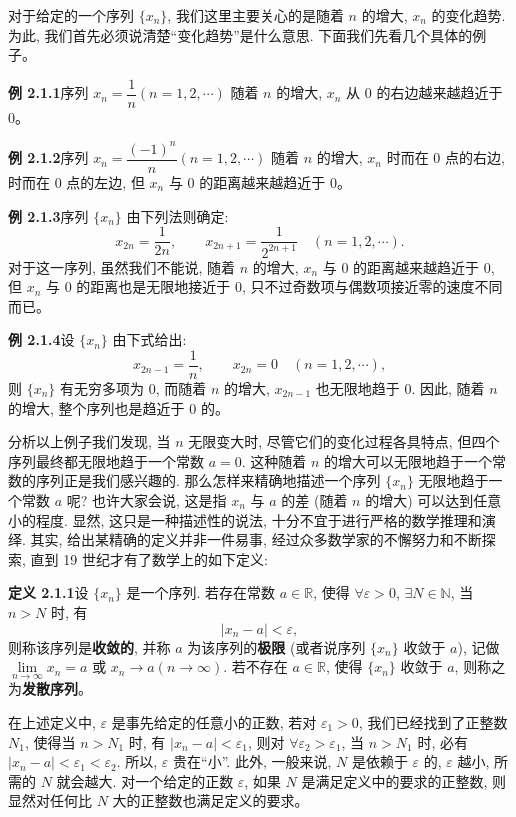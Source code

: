 \documentclass[UTF8,12pt,a4paper,fontset=fandol]{ctexart}
\begin{document}
对于给定的一个序列 $\{x_n\}$, 我们这里主要关心的是随着 $n$ 的增大, $x_n$ 的变化趋势. 为此, 我们首先必须说清楚``变化趋势''是什么意思. 下面我们先看几个具体的例子。

\noindent\textbf{例 2.1.1}\quad 序列 $x_n=\dfrac1n(n=1,2,\cdots)$ 随着 $n$ 的增大, $x_n$ 从 $0$ 的右边越来越趋近于 $0$。

\noindent\textbf{例 2.1.2}\quad 序列 $x_n=\dfrac{(-1)^n}{n}(n=1,2,\cdots)$ 随着 $n$ 的增大, $x_n$ 时而在 $0$ 点的右边, 时而在 $0$ 点的左边, 但 $x_n$ 与 $0$ 的距离越来越趋近于 $0$。

\noindent\textbf{例 2.1.3}\quad 序列 $\{x_n\}$ 由下列法则确定:
\[
  x_{2n}=\frac1{2n},\qquad
  x_{2n+1}=\frac1{2^{2n+1}}
  \quad(n=1,2,\cdots).
\]
对于这一序列, 虽然我们不能说, 随着 $n$ 的增大, $x_n$ 与 $0$ 的距离越来越趋近于 $0$, 但 $x_n$ 与 $0$ 的距离也是无限地接近于 $0$, 只不过奇数项与偶数项接近零的速度不同而已。

\noindent\textbf{例 2.1.4}\quad 设 $\{x_n\}$ 由下式给出:
\[
  x_{2n-1}=\frac1n,\qquad
  x_{2n}=0
  \quad(n=1,2,\cdots),
\]
则 $\{x_n\}$ 有无穷多项为 $0$, 而随着 $n$ 的增大, $x_{2n-1}$ 也无限地趋于 $0$. 因此, 随着 $n$ 的增大, 整个序列也是趋近于 $0$ 的。

分析以上例子我们发现, 当 $n$ 无限变大时, 尽管它们的变化过程各具特点, 但四个序列最终都无限地趋于一个常数 $a=0$. 这种随着 $n$ 的增大可以无限地趋于一个常数的序列正是我们感兴趣的. 那么怎样来精确地描述一个序列 $\{x_n\}$ 无限地趋于一个常数 $a$ 呢? 也许大家会说, 这是指 $x_n$ 与 $a$ 的差 (随着 $n$ 的增大) 可以达到任意小的程度. 显然, 这只是一种描述性的说法, 十分不宜于进行严格的数学推理和演绎. 其实, 给出某精确的定义并非一件易事, 经过众多数学家的不懈努力和不断探索, 直到 19 世纪才有了数学上的如下定义:

\noindent\textbf{定义 2.1.1}\quad 设 $\{x_n\}$ 是一个序列. 若存在常数 $a\in\mathbb{R}$, 使得 $\forall\varepsilon>0$, $\exists N\in\mathbb{N}$, 当 $n>N$ 时, 有
\[
  |x_n-a|<\varepsilon,
\]
则称该序列是\textbf{收敛的}, 并称 $a$ 为该序列的\textbf{极限} (或者说序列 $\{x_n\}$ 收敛于 $a$), 记做 $\lim\limits_{n\to\infty}x_n=a$ 或 $x_n\to a(n\to\infty)$. 若不存在 $a\in\mathbb{R}$, 使得 $\{x_n\}$ 收敛于 $a$, 则称之为\textbf{发散序列}。

在上述定义中, $\varepsilon$ 是事先给定的任意小的正数, 若对 $\varepsilon_1>0$, 我们已经找到了正整数 $N_1$, 使得当 $n>N_1$ 时, 有 $|x_n-a|<\varepsilon_1$, 则对 $\forall\varepsilon_2>\varepsilon_1$, 当 $n>N_1$ 时, 必有 $|x_n-a|<\varepsilon_1<\varepsilon_2$. 所以, $\varepsilon$ 贵在``小''. 此外, 一般来说, $N$ 是依赖于 $\varepsilon$ 的, $\varepsilon$ 越小, 所需的 $N$ 就会越大. 对一个给定的正数 $\varepsilon$, 如果 $N$ 是满足定义中的要求的正整数, 则显然对任何比 $N$ 大的正整数也满足定义的要求。
\end{document}
